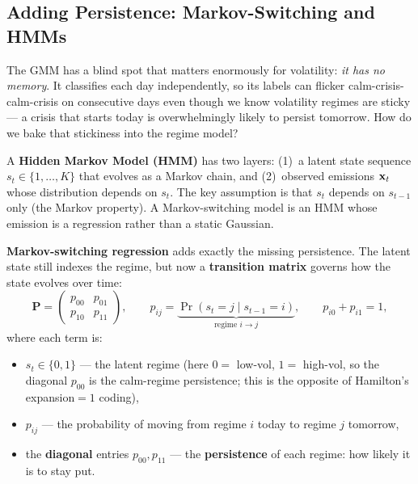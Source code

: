 \subsection{Adding Persistence: Markov-Switching and HMMs}
\label{sec:hybrid:markov}

The GMM has a blind spot that matters enormously for volatility:
\emph{it has no memory}.  It classifies each day independently, so its
labels can flicker calm-crisis-calm-crisis on consecutive days even though
we know volatility regimes are sticky --- a crisis that starts today is
overwhelmingly likely to persist tomorrow.  How do we bake that
stickiness into the regime model?

\begin{prereq}
A \textbf{Hidden Markov Model (HMM)} has two layers: (1)~a latent state
sequence $s_t \in \{1, \ldots, K\}$ that evolves as a Markov chain, and
(2)~observed emissions $\mathbf{x}_t$ whose distribution depends on $s_t$.  The
key assumption is that $s_t$ depends on $s_{t-1}$ only (the Markov
property).  A Markov-switching model is an HMM whose emission is a
regression rather than a static Gaussian.
\end{prereq}

\textbf{Markov-switching regression} \citep{Hamilton1989} adds exactly the
missing persistence.  The latent state still indexes the regime, but now a
\textbf{transition matrix} governs how the state evolves over time:
\begin{equation}\label{eq:hybrid:transition}
  \mathbf{P} = \begin{pmatrix}
    p_{00} & p_{01} \\
    p_{10} & p_{11}
  \end{pmatrix},
  \qquad
  p_{ij} = \underbrace{\Pr(s_t = j \mid s_{t-1} = i)}_{\text{regime } i \to j},
  \qquad p_{i0} + p_{i1} = 1,
\end{equation}
where each term is:
\begin{itemize}
  \item $s_t \in \{0,1\}$ --- the latent regime (here $0=$ low-vol,
        $1=$ high-vol, so the diagonal $p_{00}$ is the calm-regime
        persistence; this is the opposite of Hamilton's expansion$=1$
        coding),
  \item $p_{ij}$ --- the probability of moving from regime $i$ today to
        regime $j$ tomorrow,
  \item the \textbf{diagonal} entries $p_{00}, p_{11}$ --- the
        \textbf{persistence} of each regime: how likely it is to stay
        put.
\end{itemize}

